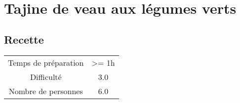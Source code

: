 \newpage
\section{Tajine de veau aux légumes verts}
    \label{sec:Tajine de veau aux légumes verts}
    \subsection{Recette}
    \vspace{1cm}


    \begin{center}
        \begin{tabular}{c|c}
            Temps de préparation & >= 1h \\
            Difficulté & 3.0 \\
            Nombre de personnes & 6.0 
        \end{tabular}
    \end{center}{}

    \vspace{1cm}
    \hline
    \vspace{1cm}

